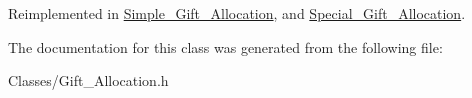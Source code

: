 Reimplemented in \hyperlink{class_simple___gift___allocation_ad2b3d876adcc2edc74d27215d8ec9a3e}{Simple\-\_\-\-Gift\-\_\-\-Allocation}, and \hyperlink{class_special___gift___allocation_a95d433a777e1c36120b30c9bee0ed75b}{Special\-\_\-\-Gift\-\_\-\-Allocation}.



The documentation for this class was generated from the following file\-:\begin{DoxyCompactItemize}
\item 
Classes/Gift\-\_\-\-Allocation.\-h\end{DoxyCompactItemize}
